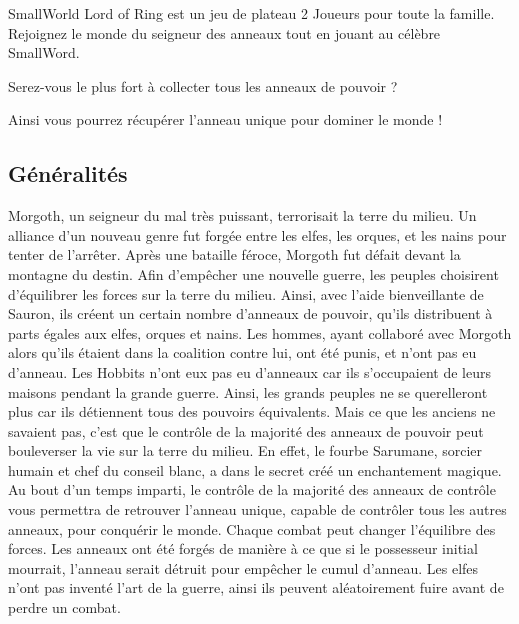 SmallWorld Lord of Ring est un jeu de plateau 2 Joueurs pour toute la famille. Rejoignez le monde du seigneur des anneaux tout en jouant au célèbre SmallWord.
\newline
\begin{center}
Serez-vous le plus fort à collecter tous les anneaux de pouvoir ?
\end{center}
\begin{center}
Ainsi vous pourrez récupérer l'anneau unique pour dominer le monde !
\end{center}

\subsection{Généralités}

Morgoth, un seigneur du mal très puissant, terrorisait la terre du milieu. Un alliance d'un nouveau genre fut forgée entre les elfes, les orques, et les nains pour tenter de l'arrêter. Après une bataille féroce, Morgoth fut défait devant la montagne du destin.
\newline
\newline
Afin d'empêcher une nouvelle guerre, les peuples choisirent d'équilibrer les forces sur la terre du milieu. Ainsi, avec l'aide bienveillante de Sauron, ils créent un certain nombre d'anneaux de pouvoir, qu'ils distribuent à parts égales aux elfes, orques et nains.
\newline
 Les hommes, ayant collaboré avec Morgoth alors qu'ils étaient dans la coalition contre lui, ont été punis, et n'ont pas eu d'anneau. Les Hobbits n'ont eux pas eu d'anneaux car ils s'occupaient de leurs maisons pendant la grande guerre.
\newline
\newline
Ainsi, les grands peuples ne se querelleront plus car ils détiennent tous des pouvoirs équivalents.
\newline
\newline
Mais ce que les anciens ne savaient pas, c'est que le contrôle de la majorité des anneaux de pouvoir peut bouleverser la vie sur la terre du milieu. En effet, le fourbe Sarumane, sorcier humain et chef du conseil blanc, a dans le secret créé un enchantement magique. Au bout d'un temps imparti, le contrôle de la majorité des anneaux de contrôle vous permettra de retrouver l'anneau unique, capable de contrôler tous les autres anneaux, pour conquérir le monde.
\newline
\newline
Chaque combat peut changer l'équilibre des forces. Les anneaux ont été forgés de manière à ce que si le possesseur initial mourrait, l'anneau serait détruit pour empêcher le cumul d'anneau. Les elfes n'ont pas inventé l'art de la guerre, ainsi ils peuvent aléatoirement fuire avant de perdre un combat. 
